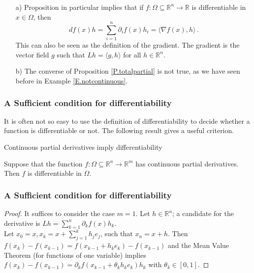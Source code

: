  \begin{frame}[fragile] \frametitle{}


\begin{itemize}
\item[a)]
Proposition in particular implies that if 
 $f\colon \Omega \subseteq \mathbb{R}^n \rightarrow \mathbb{R}$ is differentiable
in $x \in \Omega$, then
\[
df(x)h= \sum_{i=1}^n \partial_i f(x) h_i = \langle \nabla f(x), h\rangle\,.
\]
This can also be seen as the definition of the gradient. The gradient is the vector field
$g$ such that $Lh = \langle g, h\rangle$ for all $h \in \mathbb{R}^n$.
\item[b)]
The converse of Proposition \ref{P.totalpartial} is not true, as we have seen before in Example \ref{E.notcontinuous}.
\end{itemize}


\end{frame}


 \begin{frame}[fragile] \frametitle{A Sufficient condition for  differentiability}

It is often not so easy to use the definition of differentiability to decide whether
a function is differentiable or not. The following result gives a useful criterion.

\begin{block}{Continuous partial derivatives imply differentiability}

Suppose that the function
   $f\colon \Omega \subseteq \mathbb{R}^n \rightarrow \mathbb{R}^m$
  has continuous partial derivatives.
Then $f$ is differentiable in $\Omega$.
\end{block}


\end{frame}

 \begin{frame}[fragile] \frametitle{A Sufficient condition for  differentiability}

\begin{proof}
It suffices to consider the case $m=1$.
Let 
  $h \in \mathbb{R}^n$; a candidate for the derivative is 
  $Lh = \sum_{k=1}^n \partial_k f(x) h_k$.\\
Let 
  $x_0 = x, x_k = x+ \sum_{j=1}^k h_j e_j$, such that $x_n = x + h$.
Then
  $f(x_k) - f(x_{k-1}) 
  = f(x_{k-1} + h_k e_k) - f(x_{k-1})$ and
 the Mean Value Theorem (for functions of one variable) implies
$f(x_k) - f(x_{k-1})
  =\partial_k f(x_{k-1} + \theta_k h_k e_k)h_k$ with $\theta_k \in [0,1].$

\end{proof}

\end{frame}


